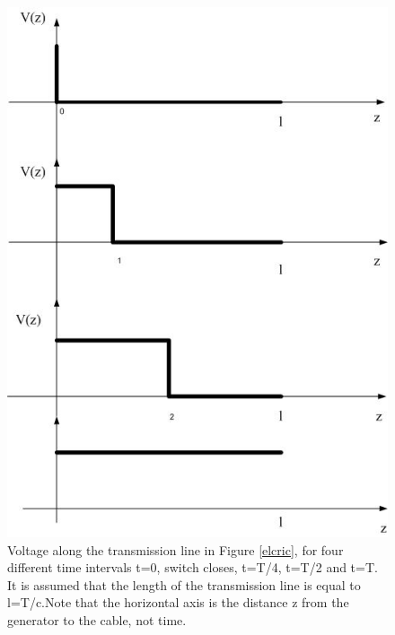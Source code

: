 \documentclass{ximera}
\begin{document}
\begin{example}
\begin{figure}[htbp]
\begin{center}
\includegraphics[scale=0.5]{jpg/timedelayedsignaltl.jpg}
\end{center}
\caption{Voltage along the transmission line in Figure \ref{elcric}, for four different time intervals t=0, switch closes, t=T/4, t=T/2 and t=T. It is assumed that the length of the transmission line is equal to l=T/c.Note that the horizontal axis is the distance z from the generator to the cable, not time. }
\label{delayedsig}
\end{figure}

\end{example}
\end{document}
